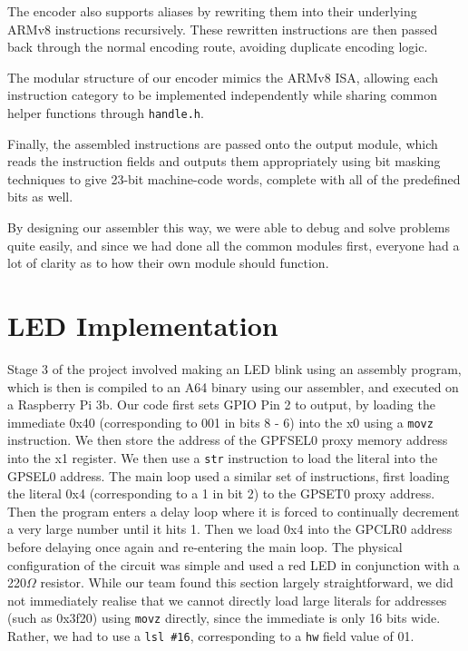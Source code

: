 \documentclass{article}
\begin{document}
The encoder also supports aliases by rewriting them into their underlying ARMv8 instructions recursively. These rewritten instructions are then passed back through the normal encoding route, avoiding duplicate encoding logic. 

The modular structure of our encoder mimics the ARMv8 ISA, allowing each instruction category to be implemented independently while sharing common helper functions through \verb|handle.h|.

Finally, the assembled instructions are passed onto the output module, which reads the instruction fields and outputs them appropriately using bit masking techniques to give 23-bit machine-code words, complete with all of the predefined bits as well.

By designing our assembler this way, we were able to debug and solve problems quite easily, and since we had done all the common modules first, everyone had a lot of clarity as to how their own module should function.

\section{LED Implementation}

Stage 3 of the project involved making an LED blink using an assembly program, which is then is compiled to an A64 binary using our assembler, and executed on a Raspberry Pi 3b. Our code first sets GPIO Pin 2 to output, by loading the immediate 0x40 (corresponding to 001 in bits 8 - 6) into the x0 using a  \verb|movz| instruction. We then store the address of the GPFSEL0 proxy memory address into the x1 register. We then use a \verb|str| instruction to load the literal into the GPSEL0 address. The main loop used a similar set of instructions, first loading the literal 0x4 (corresponding to a 1 in bit 2) to the GPSET0 proxy address. Then the program enters a delay loop where it is forced to continually decrement a very large number until it hits 1. Then we load 0x4 into the GPCLR0 address before delaying once again and re-entering the main loop. The physical configuration of the circuit was simple and used a red LED in conjunction with a 220$\Omega$ resistor. While our team found this section largely straightforward, we did not immediately realise that we cannot directly load large literals for addresses (such as 0x3f20) using \verb|movz| directly, since the immediate is only 16 bits wide. Rather, we had to use a \verb|lsl #16|, corresponding to a \verb|hw| field value of 01. 
\end{document}
